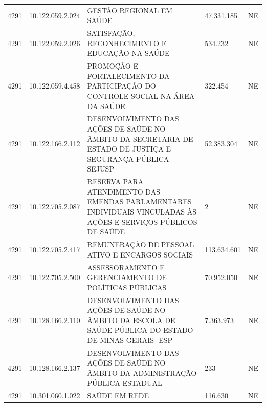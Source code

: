 \documentclass{article}
\begin{document}
\begin{longtable}[c]{m{1cm}|m{2cm}|m{10cm}|m{2cm}|m{1cm}}
\multicolumn{1}{C{1cm}|}{4291} & \multicolumn{1}{C{2cm}|}{10.122.059.2.024} & \multicolumn{1}{L{10cm}|}{GESTÃO REGIONAL EM SAÚDE} & \multicolumn{1}{R{2cm}|}{47.331.185} & \multicolumn{1}{C{1cm}}{NE} \\
\multicolumn{1}{C{1cm}|}{4291} & \multicolumn{1}{C{2cm}|}{10.122.059.2.026} & \multicolumn{1}{L{10cm}|}{SATISFAÇÃO, RECONHECIMENTO E EDUCAÇÃO NA SAÚDE} & \multicolumn{1}{R{2cm}|}{534.232} & \multicolumn{1}{C{1cm}}{NE} \\
\multicolumn{1}{C{1cm}|}{4291} & \multicolumn{1}{C{2cm}|}{10.122.059.4.458} & \multicolumn{1}{L{10cm}|}{PROMOÇÃO E FORTALECIMENTO DA PARTICIPAÇÃO DO CONTROLE SOCIAL NA ÁREA DA SAÚDE} & \multicolumn{1}{R{2cm}|}{322.454} & \multicolumn{1}{C{1cm}}{NE} \\
\multicolumn{1}{C{1cm}|}{4291} & \multicolumn{1}{C{2cm}|}{10.122.166.2.112} & \multicolumn{1}{L{10cm}|}{DESENVOLVIMENTO DAS AÇÕES DE SAÚDE NO ÂMBITO DA SECRETARIA DE ESTADO DE JUSTIÇA E SEGURANÇA PÚBLICA - SEJUSP} & \multicolumn{1}{R{2cm}|}{52.383.304} & \multicolumn{1}{C{1cm}}{NE} \\
\multicolumn{1}{C{1cm}|}{4291} & \multicolumn{1}{C{2cm}|}{10.122.705.2.087} & \multicolumn{1}{L{10cm}|}{RESERVA PARA ATENDIMENTO DAS EMENDAS PARLAMENTARES INDIVIDUAIS VINCULADAS ÀS AÇÕES E SERVIÇOS PÚBLICOS DE SAÚDE} & \multicolumn{1}{R{2cm}|}{             2} & \multicolumn{1}{C{1cm}}{NE} \\
\multicolumn{1}{C{1cm}|}{4291} & \multicolumn{1}{C{2cm}|}{10.122.705.2.417} & \multicolumn{1}{L{10cm}|}{REMUNERAÇÃO DE PESSOAL ATIVO E ENCARGOS SOCIAIS} & \multicolumn{1}{R{2cm}|}{113.634.601} & \multicolumn{1}{C{1cm}}{NE} \\
\multicolumn{1}{C{1cm}|}{4291} & \multicolumn{1}{C{2cm}|}{10.122.705.2.500} & \multicolumn{1}{L{10cm}|}{ASSESSORAMENTO E GERENCIAMENTO DE POLÍTICAS PÚBLICAS} & \multicolumn{1}{R{2cm}|}{70.952.050} & \multicolumn{1}{C{1cm}}{NE} \\
\multicolumn{1}{C{1cm}|}{4291} & \multicolumn{1}{C{2cm}|}{10.128.166.2.110} & \multicolumn{1}{L{10cm}|}{DESENVOLVIMENTO DAS AÇÕES DE SAÚDE NO ÂMBITO DA ESCOLA DE SAÚDE PÚBLICA DO ESTADO DE MINAS GERAIS- ESP} & \multicolumn{1}{R{2cm}|}{7.363.973} & \multicolumn{1}{C{1cm}}{NE} \\
\multicolumn{1}{C{1cm}|}{4291} & \multicolumn{1}{C{2cm}|}{10.128.166.2.137} & \multicolumn{1}{L{10cm}|}{DESENVOLVIMENTO DAS AÇÕES DE SAÚDE NO ÂMBITO DA ADMINISTRAÇÃO PÚBLICA ESTADUAL} & \multicolumn{1}{R{2cm}|}{233} & \multicolumn{1}{C{1cm}}{NE} \\
\multicolumn{1}{C{1cm}|}{4291} & \multicolumn{1}{C{2cm}|}{10.301.060.1.022} & \multicolumn{1}{L{10cm}|}{SAÚDE EM REDE} & \multicolumn{1}{R{2cm}|}{116.630} & \multicolumn{1}{C{1cm}}{NE} \\

\end{longtable}
\end{document}
